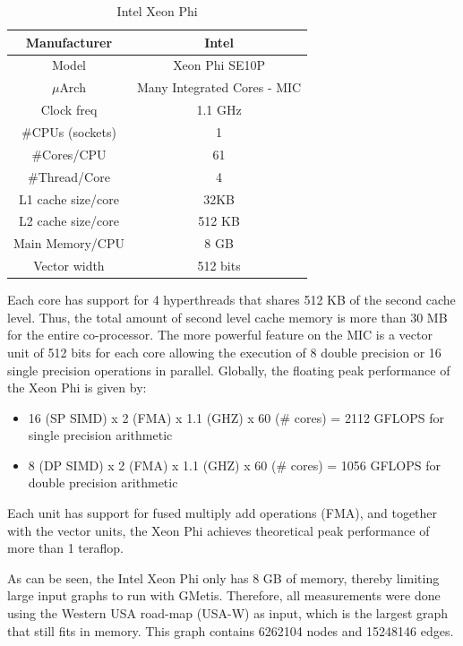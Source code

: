 \documentclass[abstract=on,9pt,twocolumn]{scrartcl}
\begin{document}
\begin{table}[H]
\centering
\footnotesize
\begin{tabular}{| c | c |}\hline
Manufacturer & Intel\\ \hline
Model & Xeon Phi SE10P\\ \hline
$\mu$Arch & Many Integrated Cores - MIC\\ \hline
Clock freq & 1.1 GHz\\ \hline
\#CPUs (sockets) & 1 \\ \hline
\#Cores/CPU & 61\\ \hline
\#Thread/Core & 4\\ \hline
L1 cache size/core & 32KB\\ \hline
L2 cache size/core & 512 KB\\ \hline
Main Memory/CPU & 8 GB\\ \hline
Vector width & 512 bits\\ \hline
\end{tabular}
\caption{Intel Xeon Phi}
\label{fig:mic}
\end{table}

Each core has support for 4 hyperthreads that shares 512 KB of the
second cache level. Thus, the total amount of second level cache memory is more
than 30 MB for the entire co-processor. The more powerful feature on the MIC
is a vector unit of 512 bits for each core allowing the execution of 8
double precision or 16 single precision operations in parallel.
Globally, the floating peak performance of the Xeon Phi is given by:

\begin{itemize}
\item 16 (SP SIMD) x 2 (FMA) x 1.1 (GHZ) x 60 (\# cores) = 2112
  GFLOPS for single precision arithmetic 
\item 8 (DP SIMD) x 2 (FMA) x 1.1 (GHZ) x 60 (\# cores) = 1056
  GFLOPS for double precision arithmetic 
\end{itemize}

Each unit has support for fused multiply add operations (FMA), and together
with the vector units, the Xeon Phi achieves theoretical peak performance of
more than 1 teraflop.

As can be seen, the Intel Xeon Phi only has 8 GB of memory, thereby
limiting large input graphs to run with GMetis. Therefore, all
measurements were done using the Western USA road-map (USA-W) as input, which is the
largest graph that still fits in memory. This graph contains 6262104
nodes and 15248146 edges.
\end{document}
